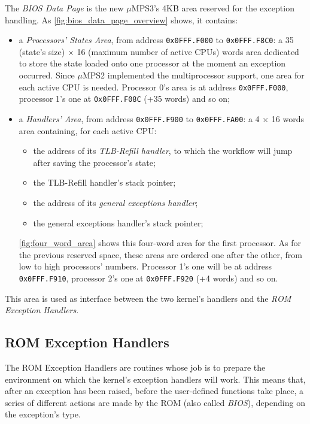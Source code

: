 \documentclass[12pt,a4paper,openright,twoside]{report}
\begin{document}
The \textit{BIOS Data Page} is the new $\mu$MPS3's 4KB area reserved for the exception handling.
As \autoref{fig:bios_data_page_overview} shows, it contains:
\begin{itemize}
	\item a \textit{Processors' States Area}, from address \texttt{0x0FFF.F000} to \texttt{0x0FFF.F8C0}: a 35 (state's size) $\times$ 16 (maximum number of active CPUs) words area dedicated to store the state loaded onto one processor at the moment an exception occurred.
	      Since $\mu$MPS2 implemented the multiprocessor support, one area for each active CPU is needed.
	      Processor 0's area is at address \texttt{0x0FFF.F000}, processor 1's one at \texttt{0x0FFF.F08C} (+35 words) and so on;
	\item a \textit{Handlers' Area}, from address \texttt{0x0FFF.F900} to \texttt{0x0FFF.FA00}: a 4 $\times$ 16 words area containing, for each active CPU:
	      \begin{itemize}
		      \item the address of its \textit{TLB-Refill handler}, to which the workflow will jump after saving the processor's state;
		      \item the TLB-Refill handler's stack pointer;
		      \item the address of its \textit{general exceptions handler};
		      \item the general exceptions handler's stack pointer;
	      \end{itemize}
	      \autoref{fig:four_word_area} shows this four-word area for the first processor.
	      As for the previous reserved space, these areas are ordered one after the other, from low to high processors' numbers.
	      Processor 1's one will be at address \texttt{0x0FFF.F910}, processor 2's one at \texttt{0x0FFF.F920} (+4 words) and so on.
\end{itemize}
This area is used as interface between the two kernel's handlers and the \textit{ROM Exception Handlers}.

\subsection{ROM Exception Handlers}
\label{chap:rom_exception_handlers}
The ROM Exception Handlers are routines whose job is to prepare the environment on which the kernel's exception handlers will work.
This means that, after an exception has been raised, before the user-defined functions take place, a series of different actions are made by the ROM (also called \textit{BIOS}), depending on the exception's type.
\end{document}
